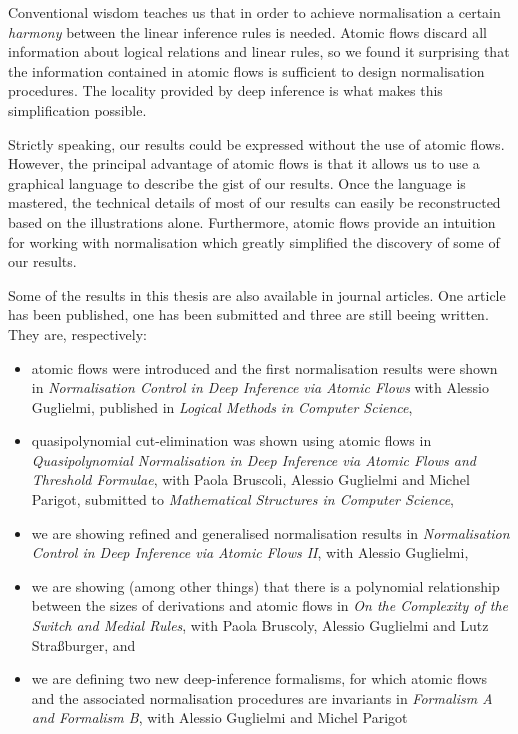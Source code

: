 Conventional wisdom teaches us that in order to achieve normalisation a certain \emph{harmony} between the linear inference rules is needed. Atomic flows discard all information about logical relations and linear rules, so we found it surprising that the information contained in atomic flows is sufficient to design normalisation procedures. The locality provided by deep inference is what makes this simplification possible.


Strictly speaking, our results could be expressed without the use of atomic flows. However, the principal advantage of atomic flows is that it allows us to use a graphical language to describe the gist of our results. Once the language is mastered, the technical details of most of our results can easily be reconstructed based on the illustrations alone. Furthermore, atomic flows provide an intuition for working with normalisation which greatly simplified the discovery of some of our results.

Some of the results in this thesis are also available in journal articles. One article has been published, one has been submitted and three are still beeing written. They are, respectively:
\begin{itemize}
 \item atomic flows were introduced and the first normalisation results were shown in \emph{Normalisation Control in Deep Inference via Atomic Flows} with Alessio Guglielmi, published in \emph{Logical Methods in Computer Science},
 \item quasipolynomial cut-elimination was shown using atomic flows in \emph{Quasipolynomial Normalisation in Deep Inference via Atomic Flows and Threshold Formulae}, with Paola Bruscoli, Alessio Guglielmi and Michel Parigot, submitted to \emph{Mathematical Structures in Computer Science},
 \item we are showing refined and generalised normalisation results in \emph{Normalisation Control in Deep Inference via Atomic Flows II}, with Alessio Guglielmi,
 \item we are showing (among other things) that there is a polynomial relationship between the sizes of derivations and atomic flows in \emph{On the Complexity of the Switch and Medial Rules}, with Paola Bruscoly, Alessio Guglielmi and Lutz Stra\ss{}burger, and
 \item we are defining two new deep-inference formalisms, for which atomic flows and the associated normalisation procedures are invariants in \emph{Formalism A and Formalism B}, with Alessio Guglielmi and Michel Parigot
\end{itemize}

